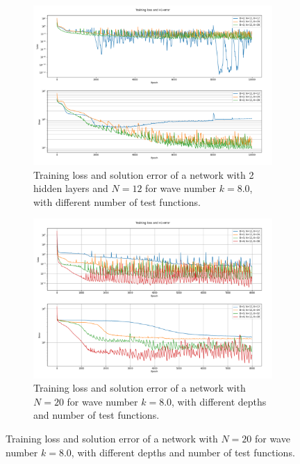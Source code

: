 \begin{figure}[h!]
    \centering
    \begin{subfigure}[b]{0.48\textwidth}
        \includegraphics[width=\textwidth]{img/VPINN-Deep-Comparison-k8increaseK.png}
        \caption{Training loss and solution error of a network with 2 hidden layers and $N=12$ for wave number $k=8.0$, with different number of test functions.}
        \label{fig:vpinnsdeepincreaseK}
    \end{subfigure}
    \hfill
    \begin{subfigure}[b]{0.48\textwidth}
        \includegraphics[width=\textwidth]{img/VPINN-Deep-Comparison-k8increaseD.png}
        \caption{Training loss and solution error of a network with $N=20$ for wave number $k=8.0$, with different depths and number of test functions.}
        \label{fig:vpinnsdeepincreaseD}
    \end{subfigure}
\end{figure}


